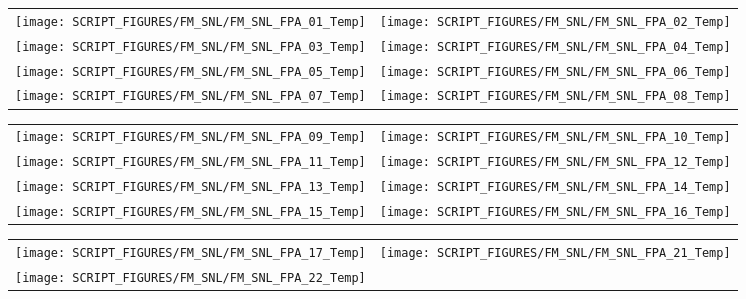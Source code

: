 \begin{figure}[p]
\begin{tabular*}{\textwidth}{l@{\extracolsep{\fill}}r}
\texttt{[image: SCRIPT\_FIGURES/FM\_SNL/FM\_SNL\_FPA\_01\_Temp]} &
\texttt{[image: SCRIPT\_FIGURES/FM\_SNL/FM\_SNL\_FPA\_02\_Temp]} \\
\texttt{[image: SCRIPT\_FIGURES/FM\_SNL/FM\_SNL\_FPA\_03\_Temp]} &
\texttt{[image: SCRIPT\_FIGURES/FM\_SNL/FM\_SNL\_FPA\_04\_Temp]} \\
\texttt{[image: SCRIPT\_FIGURES/FM\_SNL/FM\_SNL\_FPA\_05\_Temp]} &
\texttt{[image: SCRIPT\_FIGURES/FM\_SNL/FM\_SNL\_FPA\_06\_Temp]} \\
\texttt{[image: SCRIPT\_FIGURES/FM\_SNL/FM\_SNL\_FPA\_07\_Temp]} &
\texttt{[image: SCRIPT\_FIGURES/FM\_SNL/FM\_SNL\_FPA\_08\_Temp]}
\end{tabular*}
\end{figure}

\begin{figure}[p]
\begin{tabular*}{\textwidth}{l@{\extracolsep{\fill}}r}
\texttt{[image: SCRIPT\_FIGURES/FM\_SNL/FM\_SNL\_FPA\_09\_Temp]} &
\texttt{[image: SCRIPT\_FIGURES/FM\_SNL/FM\_SNL\_FPA\_10\_Temp]} \\
\texttt{[image: SCRIPT\_FIGURES/FM\_SNL/FM\_SNL\_FPA\_11\_Temp]} &
\texttt{[image: SCRIPT\_FIGURES/FM\_SNL/FM\_SNL\_FPA\_12\_Temp]} \\
\texttt{[image: SCRIPT\_FIGURES/FM\_SNL/FM\_SNL\_FPA\_13\_Temp]} &
\texttt{[image: SCRIPT\_FIGURES/FM\_SNL/FM\_SNL\_FPA\_14\_Temp]} \\
\texttt{[image: SCRIPT\_FIGURES/FM\_SNL/FM\_SNL\_FPA\_15\_Temp]} &
\texttt{[image: SCRIPT\_FIGURES/FM\_SNL/FM\_SNL\_FPA\_16\_Temp]}
\end{tabular*}
\end{figure}

\begin{figure}[p]
\begin{tabular*}{\textwidth}{l@{\extracolsep{\fill}}r}
\texttt{[image: SCRIPT\_FIGURES/FM\_SNL/FM\_SNL\_FPA\_17\_Temp]} &
\texttt{[image: SCRIPT\_FIGURES/FM\_SNL/FM\_SNL\_FPA\_21\_Temp]} \\
\texttt{[image: SCRIPT\_FIGURES/FM\_SNL/FM\_SNL\_FPA\_22\_Temp]}
\end{tabular*}
\end{figure}

